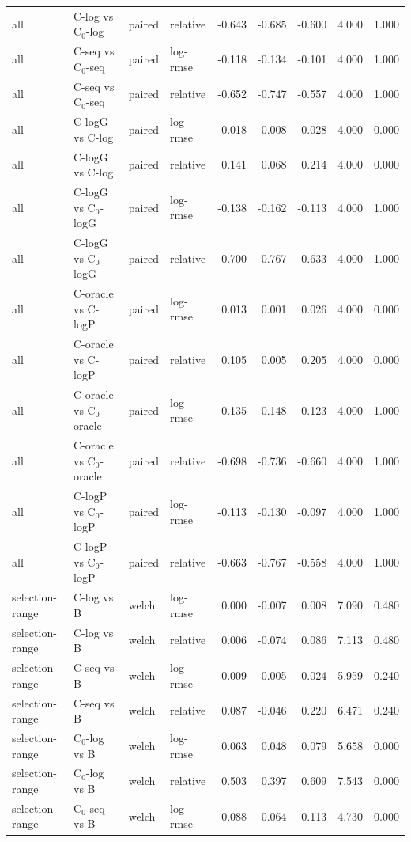 \begin{longtable}{llllrrrrr}
all & C-log vs C$_0$-log & paired & relative & -0.643 & -0.685 & -0.600 & 4.000 & 1.000 \\
all & C-seq vs C$_0$-seq & paired & log-rmse & -0.118 & -0.134 & -0.101 & 4.000 & 1.000 \\
all & C-seq vs C$_0$-seq & paired & relative & -0.652 & -0.747 & -0.557 & 4.000 & 1.000 \\
all & C-logG vs C-log & paired & log-rmse & 0.018 & 0.008 & 0.028 & 4.000 & 0.000 \\
all & C-logG vs C-log & paired & relative & 0.141 & 0.068 & 0.214 & 4.000 & 0.000 \\
all & C-logG vs C$_0$-logG & paired & log-rmse & -0.138 & -0.162 & -0.113 & 4.000 & 1.000 \\
all & C-logG vs C$_0$-logG & paired & relative & -0.700 & -0.767 & -0.633 & 4.000 & 1.000 \\
all & C-oracle vs C-logP & paired & log-rmse & 0.013 & 0.001 & 0.026 & 4.000 & 0.000 \\
all & C-oracle vs C-logP & paired & relative & 0.105 & 0.005 & 0.205 & 4.000 & 0.000 \\
all & C-oracle vs C$_0$-oracle & paired & log-rmse & -0.135 & -0.148 & -0.123 & 4.000 & 1.000 \\
all & C-oracle vs C$_0$-oracle & paired & relative & -0.698 & -0.736 & -0.660 & 4.000 & 1.000 \\
all & C-logP vs C$_0$-logP & paired & log-rmse & -0.113 & -0.130 & -0.097 & 4.000 & 1.000 \\
all & C-logP vs C$_0$-logP & paired & relative & -0.663 & -0.767 & -0.558 & 4.000 & 1.000 \\
selection-range & C-log vs B & welch & log-rmse & 0.000 & -0.007 & 0.008 & 7.090 & 0.480 \\
selection-range & C-log vs B & welch & relative & 0.006 & -0.074 & 0.086 & 7.113 & 0.480 \\
selection-range & C-seq vs B & welch & log-rmse & 0.009 & -0.005 & 0.024 & 5.959 & 0.240 \\
selection-range & C-seq vs B & welch & relative & 0.087 & -0.046 & 0.220 & 6.471 & 0.240 \\
selection-range & C$_0$-log vs B & welch & log-rmse & 0.063 & 0.048 & 0.079 & 5.658 & 0.000 \\
selection-range & C$_0$-log vs B & welch & relative & 0.503 & 0.397 & 0.609 & 7.543 & 0.000 \\
selection-range & C$_0$-seq vs B & welch & log-rmse & 0.088 & 0.064 & 0.113 & 4.730 & 0.000 \\

\end{longtable}
